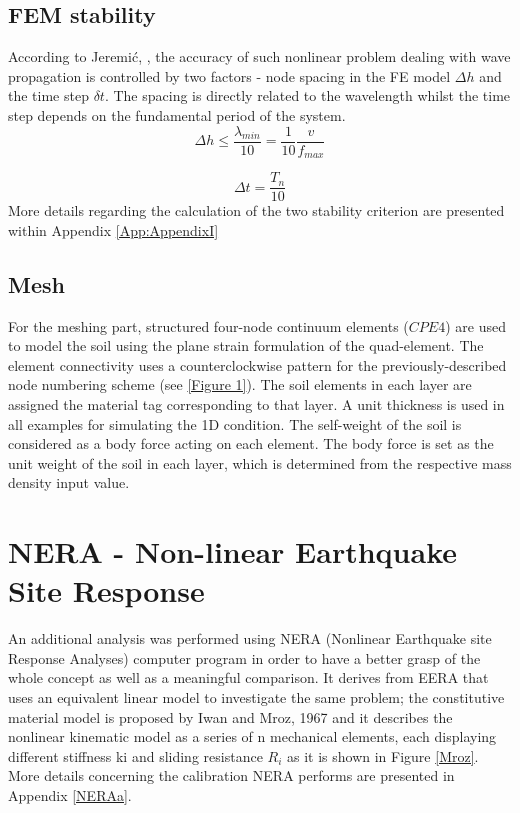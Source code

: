 	\subsection{FEM stability}
	According to Jeremi\'{c}, \cite{jeremic2009time}, the accuracy of such nonlinear problem dealing with wave propagation is controlled by two factors - node spacing in the FE model $\Delta h$ and the time step $\delta t$. The spacing is directly related to the wavelength whilst the time step depends on the fundamental period of the system. 
	\begin{equation}
	\Delta h\leq\frac{\lambda_{min}}{10}=\frac{1}{10} \frac{v}{f_{max}}
	\end{equation}
	
	\begin{equation}
	\Delta t=\frac{T_n}{10}
	\end{equation}
	More details regarding the calculation of the two stability criterion are presented within Appendix \ref{App:AppendixI}
	
	\subsection{Mesh}
	For the meshing part, structured four-node continuum elements ($CPE4$) are used to model the soil using the plane strain formulation of the quad-element. The element connectivity uses a counterclockwise pattern for the previously-described node numbering scheme (see \ref{Figure 1}). The soil elements in each layer are assigned the material tag corresponding to that layer. A unit thickness is used in all examples for simulating the 1D condition. The self-weight of the soil is considered as a body force acting on each element. The body force is set as the unit weight of the soil in each layer, which is determined from the respective mass density input value.
	
	
	\section{NERA - Non-linear Earthquake Site Response}
	An additional analysis was performed using NERA (Nonlinear Earthquake site Response Analyses) \cite{NERA} computer program in order to have a better grasp of the whole concept as well as a meaningful comparison. It derives from EERA that uses an equivalent linear model to investigate the same problem; the constitutive material model is proposed by Iwan and Mroz, 1967 \cite{mroz1967description} and it describes the nonlinear kinematic model as a series of n mechanical elements, each displaying different stiffness ki and sliding resistance $R_i$ as it is shown in Figure \ref{Mroz}. More details concerning the calibration NERA performs are presented in Appendix \ref{NERAa}. %
	
